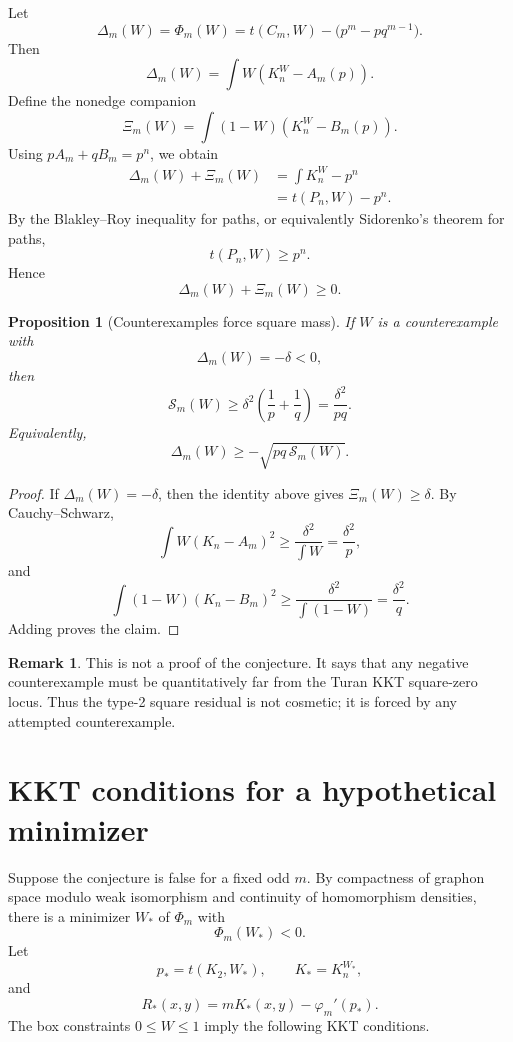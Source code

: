 \documentclass[11pt]{article}
\newtheorem{proposition}[theorem]{Proposition}
\theoremstyle{definition}
\newtheorem{remark}[theorem]{Remark}
\begin{document}
Let
\[
        \Delta_m(W)=\Phi_m(W)=t(C_m,W)-\bigl(p^m-pq^{m-1}\bigr).
\]
Then
\[
        \Delta_m(W)=\int W(K_n^W-A_m(p)).
\]
Define the nonedge companion
\[
        \Xi_m(W)=\int (1-W)(K_n^W-B_m(p)).
\]
Using $pA_m+qB_m=p^n$, we obtain
\[
\begin{aligned}
        \Delta_m(W)+\Xi_m(W)
        &=\int K_n^W-p^n\\
        &=t(P_n,W)-p^n.
\end{aligned}
\]
By the Blakley--Roy inequality for paths, or equivalently Sidorenko's theorem for paths,
\[
        t(P_n,W)\ge p^n.
\]
Hence
\[
        \Delta_m(W)+\Xi_m(W)\ge0.
\]

\begin{proposition}[Counterexamples force square mass]
If $W$ is a counterexample with
\[
        \Delta_m(W)=-\delta<0,
\]
then
\[
        \mathcal S_m(W)\ge \delta^2\left(\frac1p+\frac1q\right)=\frac{\delta^2}{pq}.
\]
Equivalently,
\[
        \Delta_m(W)\ge -\sqrt{pq\,\mathcal S_m(W)}.
\]
\end{proposition}

\begin{proof}
If $\Delta_m(W)=-\delta$, then the identity above gives $\Xi_m(W)\ge\delta$.  By Cauchy--Schwarz,
\[
        \int W(K_n-A_m)^2\ge \frac{\delta^2}{\int W}=\frac{\delta^2}{p},
\]
and
\[
        \int (1-W)(K_n-B_m)^2\ge \frac{\delta^2}{\int(1-W)}=\frac{\delta^2}{q}.
\]
Adding proves the claim.
\end{proof}

\begin{remark}
This is not a proof of the conjecture.  It says that any negative counterexample must be quantitatively far from the Turan KKT square-zero locus.  Thus the type-2 square residual is not cosmetic; it is forced by any attempted counterexample.
\end{remark}

\section{KKT conditions for a hypothetical minimizer}

Suppose the conjecture is false for a fixed odd $m$.  By compactness of graphon space modulo weak isomorphism and continuity of homomorphism densities, there is a minimizer $W_*$ of $\Phi_m$ with
\[
        \Phi_m(W_*)<0.
\]
Let
\[
        p_*=t(K_2,W_*),
        \qquad
        K_*=K_n^{W_*},
\]
and
\[
        R_*(x,y)=mK_*(x,y)-\varphi_m'(p_*).
\]
The box constraints $0\le W\le1$ imply the following KKT conditions.
\end{document}
